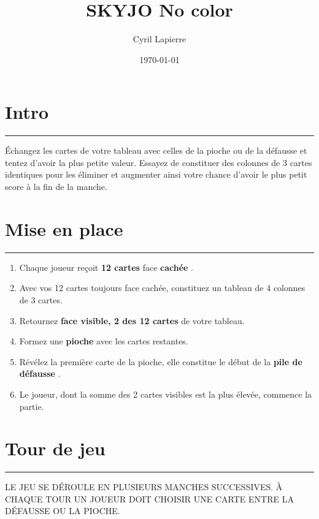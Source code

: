 \documentclass{article}%
\title{SKYJO No color}%
\author{Cyril Lapierre}%
\date{\today}%
\begin{document}
%
\normalsize%
\maketitle\thispagestyle{header}%
\pagestyle{header}%
\section{ Intro
}%
\label{sec:Intro}%
\rule{18cm}{0.07cm}\break%
Échangez les cartes de votre tableau avec celles de la pioche ou de la défausse et tentez d'avoir la plus petite valeur. Essayez de constituer des colonnes de 3 cartes identiques pour les éliminer et augmenter ainsi votre chance d'avoir le plus petit score à la fin de la manche.


%
\section{ Mise en place
}%
\label{sec:Miseenplace}%
\rule{18cm}{0.07cm}\break%
\begin{enumerate}%
\item%
%
 Chaque joueur reçoit %
\textbf{12 cartes}%
\textit{ }%
 face %
\textbf{cachée}%
.
%
\item%
%
 Avec vos 12 cartes toujours face cachée, constituez un tableau de 4 colonnes de 3 cartes.
%
\item%
%
 Retournez %
\textbf{face visible, 2 des 12 cartes}%
\textit{ }%
 de votre tableau.
%
\item%
%
 Formez une %
\textbf{pioche}%
\textit{ }%
 avec les cartes restantes.
%
\item%
%
 Révélez la première carte de la pioche, elle constitue le début de la %
\textbf{pile de défausse}%
.
%
\item%
%
 Le joueur, dont la somme des 2 cartes visibles est la plus élevée, commence la partie.
%
\end{enumerate}

%
\section{ Tour de jeu
}%
\label{sec:Tourdejeu}%
\rule{18cm}{0.07cm}\break%
LE JEU SE DÉROULE EN PLUSIEURS MANCHES SUCCESSIVES. À CHAQUE TOUR UN JOUEUR DOIT CHOISIR UNE CARTE ENTRE LA DÉFAUSSE OU LA PIOCHE.


%
\end{document}
